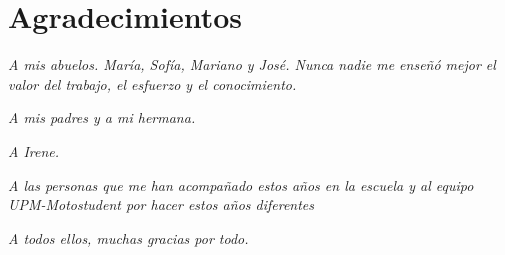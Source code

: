 \chapter{Agradecimientos}

\textit{A mis abuelos. María, Sofía, Mariano y José. Nunca nadie me enseñó mejor el valor del trabajo, el esfuerzo y el conocimiento.}

\textit{A mis padres y a mi hermana.}

\textit{A Irene.}

\textit{A las personas que me han acompañado estos años en la escuela y al equipo UPM-Motostudent por hacer estos años diferentes}

\textit{A todos ellos, muchas gracias por todo.}